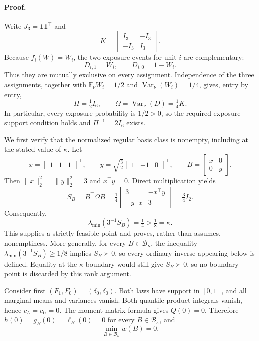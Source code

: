 \paragraph{Proof.}
Write \(J_3=\mathbf 1\mathbf 1^{\top}\) and
\[
K=\begin{bmatrix}I_3&-I_3\\-I_3&I_3\end{bmatrix}.
\]
Because \(f_i(W)=W_i\), the two exposure events for unit \(i\) are complementary:
\[
D_{i,1}=W_i,
\qquad
D_{i,0}=1-W_i.
\]
Thus they are mutually exclusive on every assignment.  Independence of the three assignments, together with \(\mathbb E_\nu W_i=1/2\) and \(\operatorname{Var}_\nu(W_i)=1/4\), gives, entry by entry,
\[
\Pi=\tfrac12 I_6,
\qquad
\Omega=\operatorname{Var}_\nu(D)=\tfrac14K.
\]
In particular, every exposure probability is \(1/2>0\), so the required exposure support condition holds and \(\Pi^{-1}=2I_6\) exists.

We first verify that the normalized regular basis class is nonempty, including at the stated value of \(\kappa\).  Let
\[
x=\begin{bmatrix}1&1&1\end{bmatrix}^{\top},
\qquad
y=\sqrt{\tfrac32}\begin{bmatrix}1&-1&0\end{bmatrix}^{\top},
\qquad
B=\begin{bmatrix}x&0\\0&y\end{bmatrix}.
\]
Then \(\lVert x\rVert_2^2=\lVert y\rVert_2^2=3\) and \(x^{\top}y=0\).  Direct multiplication yields
\[
S_B=B^{\top}\Omega B
=\tfrac14
\begin{bmatrix}
3&-x^{\top}y\\
-y^{\top}x&3
\end{bmatrix}
=\tfrac34 I_2.
\]
Consequently,
\[
\lambda_{\min}(3^{-1}S_B)=\tfrac14>\tfrac18=\kappa.
\]
This supplies a strictly feasible point and proves, rather than assumes, nonemptiness.  More generally, for every \(B\in\mathcal B_\kappa\), the inequality \(\lambda_{\min}(3^{-1}S_B)\ge 1/8\) implies \(S_B\succ0\), so every ordinary inverse appearing below is defined.  Equality at the \(\kappa\)-boundary would still give \(S_B\succ0\), so no boundary point is discarded by this rank argument.

Consider first \((F_1,F_0)=(\delta_0,\delta_0)\).  Both laws have support in \([0,1]\), and all marginal means and variances vanish.  Both quantile-product integrals vanish, hence \(c_L=c_U=0\).  The moment-matrix formula gives \(Q(0)=0\).  Therefore \(h(0)=g_B(0)=\ell_B(0)=0\) for every \(B\in\mathcal B_\kappa\), and
\[
\min_{B\in\mathcal B_\kappa}w(B)=0.
\]

